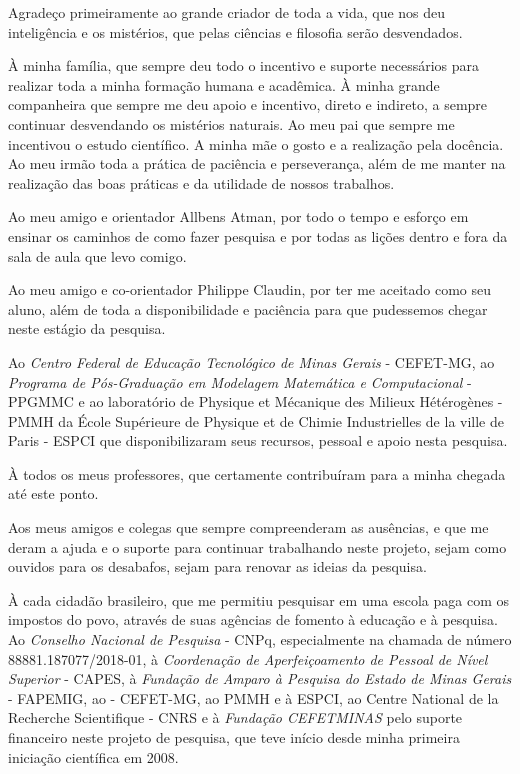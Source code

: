 \begin{agradecimentos}[Acknowledgements]
\newpage

Agradeço primeiramente ao grande criador de toda a vida, que nos deu inteligência e os mistérios, que pelas ciências e filosofia serão desvendados.

À minha família, que sempre deu todo o incentivo e suporte necessários para realizar toda a minha formação humana e acadêmica. À minha grande companheira que sempre me deu apoio e incentivo, direto e indireto, a sempre continuar desvendando os mistérios naturais. Ao meu pai que sempre me incentivou o estudo científico. A minha mãe o gosto e a realização pela docência. Ao meu irmão toda a prática de paciência e perseverança, além de me manter na realização das boas práticas e da utilidade de nossos trabalhos.

Ao meu amigo e orientador Allbens Atman, por todo o tempo e esforço em ensinar os caminhos de como fazer pesquisa e por todas as lições dentro e fora da sala de aula que levo comigo.

Ao meu amigo e co-orientador Philippe Claudin, por ter me aceitado como seu aluno, além de toda a disponibilidade e paciência para que pudessemos chegar neste estágio da pesquisa.

Ao \textit{Centro Federal de Educação Tecnológico de Minas Gerais} - CEFET-MG, ao \textit{Programa de Pós-Graduação em Modelagem Matemática e Computacional} - PPGMMC e ao laboratório de Physique et Mécanique des Milieux Hétérogènes - PMMH da École Supérieure de Physique et de Chimie Industrielles de la ville de Paris - ESPCI que disponibilizaram seus recursos, pessoal e apoio nesta pesquisa.

À todos os meus professores, que certamente contribuíram para a minha chegada até este ponto.

Aos meus amigos e colegas que sempre compreenderam as ausências, e que me deram a ajuda e o suporte para continuar trabalhando neste projeto, sejam como ouvidos para os desabafos, sejam para renovar as ideias da pesquisa.


À cada cidadão brasileiro, que me permitiu pesquisar em uma escola paga com os impostos do povo, através de suas agências de fomento à educação e à pesquisa. Ao \textit{Conselho Nacional de Pesquisa} - CNPq, especialmente na chamada de número 88881.187077/2018-01, à \textit{Coordenação de Aperfeiçoamento de Pessoal de Nível Superior} - CAPES, à \textit{Fundação de Amparo à Pesquisa do Estado de Minas Gerais} - FAPEMIG, ao - CEFET-MG, ao PMMH e à ESPCI, ao Centre National de la Recherche Scientifique - CNRS e à \textit{Fundação CEFETMINAS} pelo suporte financeiro neste projeto de pesquisa, que teve início desde minha primeira iniciação científica em 2008.

\end{agradecimentos}
